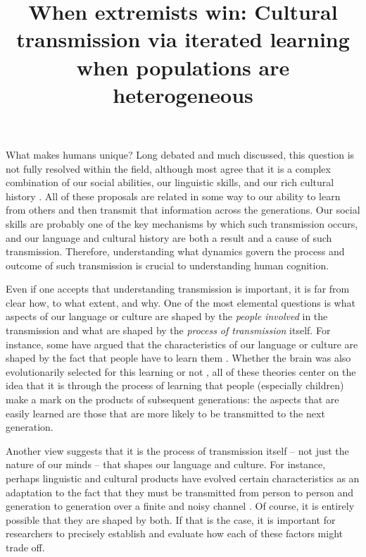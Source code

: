 \documentclass[doc]{apa6}
\title{When extremists win: Cultural transmission via iterated learning when populations are heterogeneous}
\begin{document}
 

\maketitle
 
What makes humans unique? Long debated and much discussed, this question is not fully resolved within the field, although most agree that it is a complex combination of our social abilities, our linguistic skills, and our rich cultural history \parencite{sperber96,tomasello99,pinkerjackendoff05,hermannetal07,gintis11,scottphillips14}. All of these proposals are related in some way to our ability to learn from others and then transmit that information across the generations. Our social skills are probably one of the key mechanisms by which such transmission occurs, and our language and cultural history are both a result and a cause of such transmission. Therefore, understanding what dynamics govern the process and outcome of such transmission is crucial to understanding human cognition.

Even if one accepts that understanding transmission is important, it is far from clear how, to what extent, and why. One of the most elemental questions is what aspects of our language or culture are shaped by the {\it people involved} in the transmission and what are shaped by the {\it process of transmission} itself. For instance, some have argued that the characteristics of our language or culture are shaped by the fact that people have to learn them \parencite{pinkerbloom90,deacon97,pinker03,christiansenchater08,kempregier12}. Whether the brain was also evolutionarily selected for this learning \parencite{pinker03} or not \parencite{christiansenchater08}, all of these theories center on the idea that it is through the process of learning that people (especially children) make a mark on the products of subsequent generations: the aspects that are easily learned are those that are more likely to be transmitted to the next generation. 

Another view suggests that it is the process of transmission itself -- not just the nature of our minds -- that shapes our language and culture. For instance, perhaps linguistic and cultural products have evolved certain characteristics as an adaptation to the fact that they must be transmitted from person to person and generation to generation over a finite and noisy channel \parencite{kirby01,kirbyetal15}. Of course, it is entirely possible that they are shaped by both. If that is the case, it is important for researchers to precisely establish and evaluate how each of these factors might trade off. 
\end{document}
